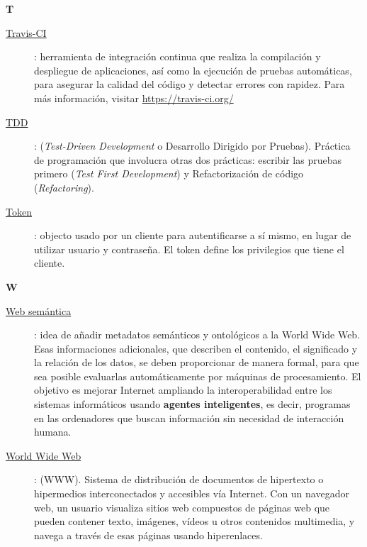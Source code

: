 {\bfseries {\Huge T}}\label{Apendice1:T}
\bigskip
\bigskip

\begin{description}
  \item[\underline{Travis-CI}\label{apend1:travis}]: herramienta de integración continua que realiza la compilación y despliegue de aplicaciones, así como la ejecución de pruebas automáticas, para asegurar la calidad del código y detectar errores con rapidez. Para más información, visitar {\small \url{https://travis-ci.org/}}
  \bigskip
\end{description}

\begin{description}
  \item[\underline{TDD}\label{apend1:tdd}]: (\textit{Test-Driven Development} o Desarrollo Dirigido por Pruebas). Práctica de programación que involucra otras dos prácticas: escribir las pruebas primero (\textit{Test First Development}) y Refactorización de código (\textit{Refactoring}).
  \bigskip
\end{description}

\begin{description}
  \item[\underline{Token}\label{apend1:token}]: objecto usado por un cliente para autentificarse a sí mismo, en lugar de utilizar usuario y contraseña. El token define los privilegios que tiene el cliente.
  \bigskip
\end{description}

\bigskip
{\bfseries {\Huge W}}\label{Apendice1:W}
\bigskip
\bigskip

\begin{description}
  \item[\underline{Web semántica}\label{apend1:web}]: idea de añadir metadatos semánticos y ontológicos a la World Wide Web. Esas informaciones adicionales, que describen el contenido, el significado y la relación de los datos, se deben proporcionar de manera formal, para que sea posible evaluarlas automáticamente por máquinas de procesamiento. El objetivo es mejorar Internet ampliando la interoperabilidad entre los sistemas informáticos usando {\bfseries agentes inteligentes}, es decir, programas en las ordenadores que buscan información sin necesidad de interacción humana.
  \bigskip
\end{description}

\begin{description}
  \item[\underline{World Wide Web}\label{apend1:www}]: (WWW). Sistema de distribución de documentos de hipertexto o hipermedios interconectados y accesibles vía Internet. Con un navegador web, un usuario visualiza sitios web compuestos de páginas web que pueden contener texto, imágenes, vídeos u otros contenidos multimedia, y navega a través de esas páginas usando hiperenlaces.
  \bigskip
\end{description}